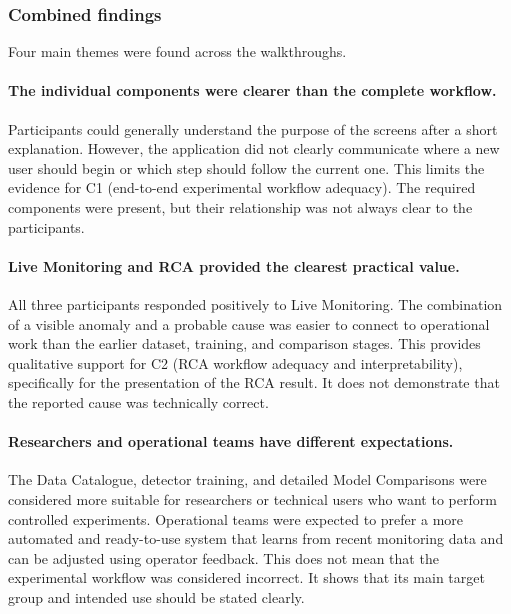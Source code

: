 \subsubsection{Combined findings}

Four main themes were found across the walkthroughs.

\paragraph{The individual components were clearer than the complete workflow.}

Participants could generally understand the purpose of the screens after a short explanation. However, the application did not clearly communicate where a new user should begin or which step should follow the current one. This limits the evidence for C1 (end-to-end experimental workflow adequacy). The required components were present, but their relationship was not always clear to the participants.

\paragraph{Live Monitoring and RCA provided the clearest practical value.}

All three participants responded positively to Live Monitoring. The combination of a visible anomaly and a probable cause was easier to connect to operational work than the earlier dataset, training, and comparison stages. This provides qualitative support for C2 (RCA workflow adequacy and interpretability), specifically for the presentation of the RCA result. It does not demonstrate that the reported cause was technically correct.

\paragraph{Researchers and operational teams have different expectations.}

The Data Catalogue, detector training, and detailed Model Comparisons were considered more suitable for researchers or technical users who want to perform controlled experiments. Operational teams were expected to prefer a more automated and ready-to-use system that learns from recent monitoring data and can be adjusted using operator feedback. This does not mean that the experimental workflow was considered incorrect. It shows that its main target group and intended use should be stated clearly.

